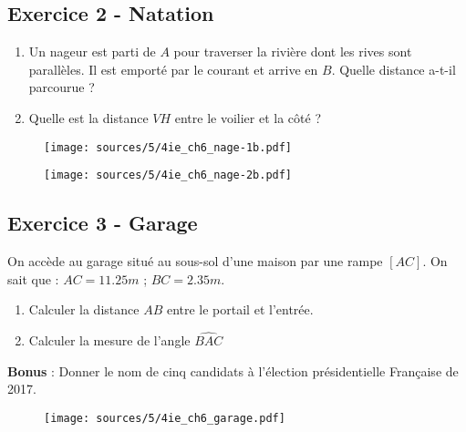 \documentclass[10pt]{article}
\begin{document}
\begin{multicols}{2}

  \subsection*{Exercice 2 - Natation} 

  \begin{enumerate}
  \item[1.] Un nageur est parti de $A$ pour traverser la rivière dont les rives sont parallèles. Il est emporté par le courant et arrive en $B$. Quelle distance a-t-il parcourue ?

  \item[2.]Quelle est la distance $VH$ entre le voilier et la côté ?
  \end{enumerate}

  \begin{figure}[H]
    \centering
    \texttt{[image: sources/5/4ie\_ch6\_nage-1b.pdf]}
  \end{figure}

  \begin{figure}[H]
    \centering
    \texttt{[image: sources/5/4ie\_ch6\_nage-2b.pdf]}
  \end{figure}
\end{multicols}

\begin{multicols}{2}
  \subsection*{Exercice 3 - Garage}

  On accède au garage situé au sous-sol d'une maison par une rampe $[AC]$.
  On sait que : $AC = 11.25 m$ ; $BC = 2.35 m$.

  \begin{enumerate}
  \item[1.] Calculer la distance $AB$ entre le portail et l'entrée.
  \item[2.] Calculer la mesure de l'angle $\widehat{BAC}$
  \end{enumerate}
  \textbf{Bonus} : Donner le nom de cinq candidats à l'élection présidentielle Française de 2017.

  \begin{figure}[H]
    \centering
    \texttt{[image: sources/5/4ie\_ch6\_garage.pdf]}
  \end{figure}

\end{multicols}
\end{document}
